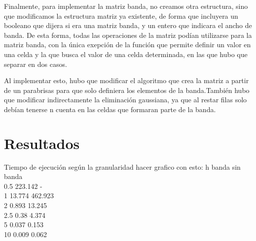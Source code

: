 \documentclass[spanish,a4paper]{article}
\begin{document}
Finalmente, para implementar la matriz banda, no creamos otra estructura, sino que modificamos la estructura matriz ya existente, de forma que incluyera un booleano que dijera si era una matriz banda, y un entero que indicara el ancho de banda. De esta forma, todas las operaciones de la matriz podían utilizarse para la matriz banda, con la única exepción de la función que permite definir un valor en una celda y la que busca el valor de una celda determinada, en las que hubo que separar en dos casos.

Al implementar esto, hubo que modificar el algoritmo que crea la matriz a partir de un parabrisas para que solo definiera los elementos de la banda.También hubo que modificar indirectamente la eliminación gaussiana, ya que al restar filas solo debían tenerse n cuenta en las celdas que formaran parte de la banda.  %



\section{Resultados}

Tiempo de ejecución según la granularidad
hacer grafico con esto:
h banda	sin banda\\
0.5  223.142 -	\\
1  13.774	462.923\\
2  0.893	13.245\\
2.5  0.38	4.374\\
5  0.037	0.153\\
10  0.009	0.062\\




\end{document}
